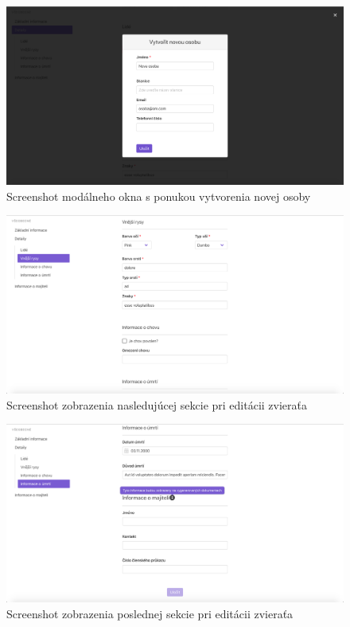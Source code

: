 \begin{figure}[H]
	\includegraphics[width=1.0\textwidth]{media/priloha/zviera/editacia/5.png}
	\caption{Screenshot modálneho okna s ponukou vytvorenia novej osoby}
\end{figure}

\vspace*{\fill}

\begin{figure}[H]
	\includegraphics[width=1.0\textwidth]{media/priloha/zviera/editacia/6.png}
	\caption{Screenshot zobrazenia nasledujúcej sekcie pri editácii zvieraťa}
\end{figure}

\begin{figure}[H]
	\includegraphics[width=1.0\textwidth]{media/priloha/zviera/editacia/7.png}
	\caption{Screenshot zobrazenia poslednej sekcie pri editácii zvieraťa}
\end{figure}

